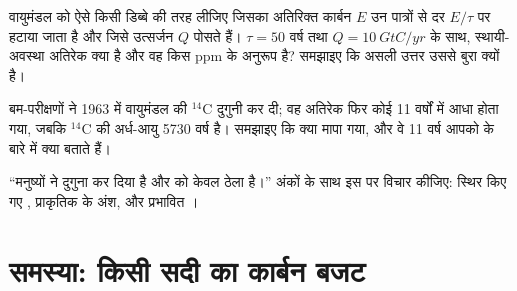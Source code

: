 \begin{exercise}[$\star\star\star$]\label{exo:b2:biogeochemical-cycles:10}
वायुमंडल को ऐसे किसी डिब्बे की तरह लीजिए जिसका अतिरिक्त कार्बन $E$ उन पात्रों से
दर $E/\tau$ पर हटाया जाता है और जिसे उत्सर्जन $Q$ पोसते हैं। $\tau =
50$ वर्ष तथा $Q = \qty{10}{GtC/yr}$ के साथ, स्थायी-अवस्था
अतिरेक क्या है और वह किस ppm के अनुरूप है? समझाइए कि असली
उत्तर उससे बुरा क्यों है।
\end{exercise}

\begin{exercise}[$\star\star\star$]\label{exo:b2:biogeochemical-cycles:11}
बम-परीक्षणों ने 1963 में वायुमंडल की $\mathrm{{}^{14}C}$ दुगुनी कर दी; वह
अतिरेक फिर कोई 11 वर्षों में आधा होता गया, जबकि $\mathrm{{}^{14}C}$
की अर्ध-आयु 5730 वर्ष है। समझाइए कि क्या मापा गया, और
वे 11 वर्ष आपको  के बारे में क्या बताते हैं।
\end{exercise}

\begin{exercise}[$\star\star\star$]\label{exo:b2:biogeochemical-cycles:12}
``मनुष्यों ने  दुगुना कर दिया है और 
को केवल ठेला है।'' अंकों के साथ इस पर विचार कीजिए: स्थिर किए गए , प्राकृतिक
 के अंश, और प्रभावित ।
\end{exercise}

\section{समस्या: किसी सदी का कार्बन बजट}

